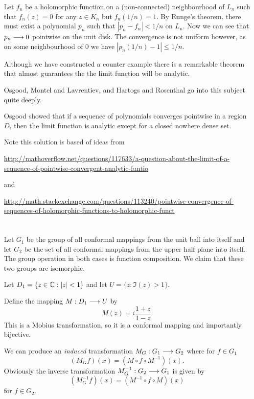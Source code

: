 \documentclass{unswmaths}
\begin{document}
Let $ f_n $ be a holomorphic function on a (non-connected) neighbourhood of $ L_n $ such that $ f_n(z) = 0 $ for any $ z \in K_n $ but $ f_n(1/n) = 1 $. By Runge's theorem, there must exist a polynomial $ p_n $ such that $ |p_n - f_n| < 1/n $ on $ L_n $. Now we can see that $ p_n \longrightarrow 0 $ pointwise  on the unit disk. The convergence is not uniform however, as on some neighbourhood of $ 0 $ we have $ |p_n(1/n) - 1| \leq 1/n $.

Although we have constructed a counter example there is a remarkable theorem that almost guarantees the the limit function will be analytic. 

Osgood, Montel and Lavrentiev, \cite{Osgood1936} and Hartogs and Rosenthal\cite{Hartogs1928} go into this subject quite deeply. 

Osgood showed that if a sequence of polynomials converges pointwise in a region $ D $, then the limit function is analytic except for a closed nowhere dense set.

Note this solution is based of ideas from 

\url{http://mathoverflow.net/questions/117633/a-question-about-the-limit-of-a-sequence-of-pointwise-convergent-analytic-funtio} 

and

\url{http://math.stackexchange.com/questions/113240/pointwise-convergence-of-sequences-of-holomorphic-functions-to-holomorphic-funct}

\section{}

Let $ G_1 $ be the group of all conformal mappings from the unit ball into itself and let $ G_2 $ be the set of all conformal mappings from the upper half plane into itself. The group operation in both cases is function composition.  We claim that these two groups are isomorphic. 

Let $ D_1 = \{ z \in \mathbb{C} : |z| < 1 \} $ and let $ U = \{ z : \Im(z) > 1 \} $.

Define the mapping $ M : D_1 \longrightarrow U $ by
$$ M(z) = i\frac{1+z}{1-z}.$$
This is a Mobius transformation, so it is a conformal mapping and importantly bijective. 

We can produce an \emph{induced} transformation $ M_G : G_1 \longrightarrow G_2 $ where for $ f \in G_1 $
$$
	(M_G f)(x) = (M \circ f \circ M^{-1})(x).
$$
Obviously the inverse transformation $ M^{-1}_G : G_2 \longrightarrow G_1 $ is given by 
$$
	(M^{-1}_G f)(x) = (M^{-1} \circ f \circ M)(x) 
$$
for $ f \in G_2 $.
\end{document}
